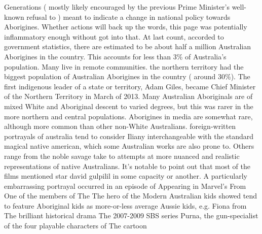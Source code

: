 \documentclass[12pt]{book}
\begin{document}
Generations ( mostly likely encouraged by the previous Prime Minister's well-known refusal to ) meant to indicate a change in national policy towards Aborigines. Whether actions will back up the words, this page was potentially inflammatory enough without got into that. At last count, accorded to government statistics, there are estimated to be about half a million Australian Aborigines in the country. This accounts for less than 3\% of Australia's population. Many live in remote communities. the northern territory had the biggest population of Australian Aborigines in the country ( around 30\%). The first indigenous leader of a state or territory, Adam Giles, became Chief Minister of the Northern Territory in March of 2013. Many Australian Aboriginals are of mixed White and Aboriginal descent to varied degrees, but this was rarer in the more northern and central populations. Aborigines in media are somewhat rare, although more common than other non-White Australians. foreign-written portrayals of australia tend to consider Iliany interchangeable with the standard magical native american, which some Australian works are also prone to. Others range from the noble savage take to attempts at more nuanced and realistic representations of native Australians. It's notable to point out that most of the films mentioned star david gulpilil in some capacity or another. A particularly embarrassing portrayal occurred in an episode of Appearing in Marvel's From One of the members of The The hero of the Modern Australian kids showed tend to feature Aboriginal kids as more-or-less average Aussie kids, e.g. Fiona from The brilliant historical drama The 2007-2009 SBS series Purna, the gun-specialist of the four playable characters of The cartoon
\end{document}
